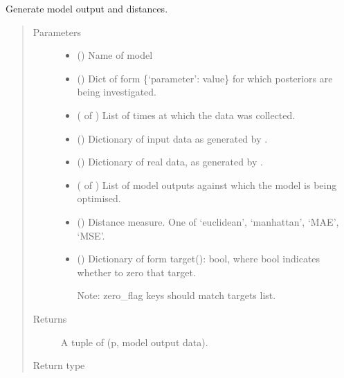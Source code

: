 \documentclass[letterpaper,10pt,english]{sphinxmanual}
\begin{document}
\begin{fulllineitems}
\label{\detokenize{misc:bayescmd.results_handling.get_output}}
Generate model output and distances.
\begin{quote}\begin{description}
\item[{Parameters}] \leavevmode\begin{itemize}
\item {} 
 () \textendash{} Name of model

\item {} 
 () \textendash{} Dict of form \{‘parameter’: value\} for which posteriors are being
investigated.

\item {} 
 ( of ) \textendash{} List of times at which the data was collected.

\item {} 
 () \textendash{} Dictionary of input data as generated by .

\item {} 
 () \textendash{} Dictionary of real data, as generated by .

\item {} 
 ( of ) \textendash{} List of model outputs against which the model is being optimised.

\item {} 
 () \textendash{} Distance measure. One of ‘euclidean’, ‘manhattan’, ‘MAE’, ‘MSE’.

\item {} 
 () \textendash{} 
Dictionary of form target(): bool, where bool indicates
whether to zero that target.

Note: zero\_flag keys should match targets list.


\end{itemize}

\item[{Returns}] \leavevmode
A tuple of (p, model output data).

\item[{Return type}] \leavevmode
{}

\end{description}\end{quote}

\end{fulllineitems}
\end{document}
